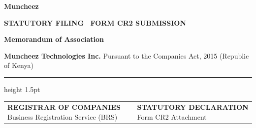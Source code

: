 \documentclass[11pt,a4paper]{article}
\begin{document}
\pagestyle{empty}
\begin{titlepage}
    \vspace*{2.5cm}
    
    {\fontsize{44}{52}\sffamily\bfseries\color{CorporateNavy} Muncheez}
    
    \vspace{0.8cm}
    
    
    \vspace{2.5cm}
    
    {\fontsize{11}{14}\sffamily\bfseries\color{LinkBlue}\uppercase{Statutory Filing \textperiodcentered\ Form CR2 Submission}}
    
    \vspace{0.5cm}
    
    {\fontsize{28}{34}\sffamily\bfseries\color{CorporateNavy} Memorandum of Association}
    
    \vspace{1.0cm}
    
    {\fontsize{11}{16}\sffamily\bfseries\color{CorporateNavy} Muncheez Technologies Inc.} \newline
    {\fontsize{10}{14}\sffamily\color{SolidBlack} Pursuant to the Companies Act, 2015 (Republic of Kenya)}
    
    \vfill
    
    \color{RuleNavy}\hrule height 1.5pt
    \vspace{0.5cm}
    
    \begin{tabularx}{\textwidth}{@{} X >{\raggedleft\arraybackslash}X @{}}
        \textsf{\small\bfseries\color{CorporateNavy} REGISTRAR OF COMPANIES} \newline
        \textsf{\scriptsize\color{SolidBlack} Business Registration Service (BRS)} &
        \textsf{\small\bfseries\color{CorporateNavy} STATUTORY DECLARATION} \newline
        \textsf{\scriptsize\color{SolidBlack} Form CR2 Attachment} \\
    \end{tabularx}
\end{titlepage}
\end{document}
